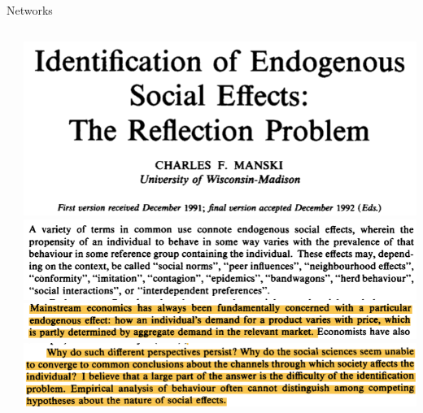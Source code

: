\documentclass[notes,11pt, aspectratio=169]{beamer}
\newenvironment{wideitemize}{\itemize\addtolength{\itemsep}{10pt}}{\enditemize}
\begin{document}
\begin{frame}{Networks}
\begin{columns}[T]
\begin{column}{.5\textwidth}
\begin{wideitemize}
    \end{wideitemize}
  \end{column}%
  \hfill%
  \begin{column}{.5\textwidth}
    \begin{center}
      \includegraphics[width=\linewidth]{images/manski0.png}\\
      \includegraphics[width=\linewidth]{images/manski1.png}\\
      \includegraphics[width=\linewidth]{images/manski2.png}\\
      \includegraphics[width=\linewidth]{images/manski3.png}            
    \end{center}
  \end{column}
\end{columns}
\end{frame}
\end{document}
